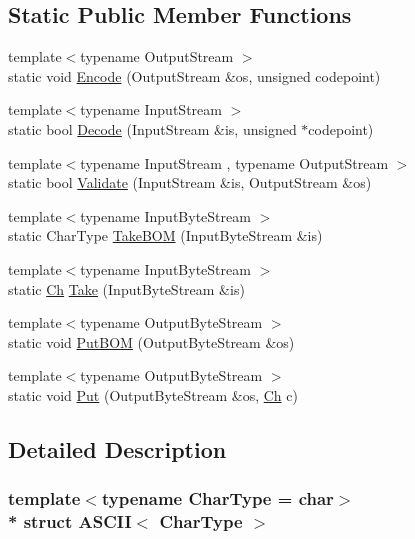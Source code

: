 \subsection*{Static Public Member Functions}
\begin{DoxyCompactItemize}
\item 
{\footnotesize template$<$typename Output\+Stream $>$ }\\static void \hyperlink{structASCII_af56b1605fe233c54693facc7de457f72}{Encode} (Output\+Stream \&os, unsigned codepoint)
\item 
{\footnotesize template$<$typename Input\+Stream $>$ }\\static bool \hyperlink{structASCII_a44844bbfd0a4fc282993fd72f3f58eee}{Decode} (Input\+Stream \&is, unsigned $\ast$codepoint)
\item 
{\footnotesize template$<$typename Input\+Stream , typename Output\+Stream $>$ }\\static bool \hyperlink{structASCII_a398680588a09e6ce9b56e32195047c78}{Validate} (Input\+Stream \&is, Output\+Stream \&os)
\item 
{\footnotesize template$<$typename Input\+Byte\+Stream $>$ }\\static Char\+Type \hyperlink{structASCII_aad78500eb98f45582a4df020e3fb2278}{Take\+B\+OM} (Input\+Byte\+Stream \&is)
\item 
{\footnotesize template$<$typename Input\+Byte\+Stream $>$ }\\static \hyperlink{structASCII_a1baf6e7914f165be952c30db664cefb4}{Ch} \hyperlink{structASCII_ab1b9fdf0a5c05658d62fded913d923a3}{Take} (Input\+Byte\+Stream \&is)
\item 
{\footnotesize template$<$typename Output\+Byte\+Stream $>$ }\\static void \hyperlink{structASCII_a3036dc1d604039c3224ca0a890ee0134}{Put\+B\+OM} (Output\+Byte\+Stream \&os)
\item 
{\footnotesize template$<$typename Output\+Byte\+Stream $>$ }\\static void \hyperlink{structASCII_a218b244b9cd961ea6c5775a734cec20e}{Put} (Output\+Byte\+Stream \&os, \hyperlink{structASCII_a1baf6e7914f165be952c30db664cefb4}{Ch} c)
\end{DoxyCompactItemize}


\subsection{Detailed Description}
\subsubsection*{template$<$typename Char\+Type = char$>$\\*
struct A\+S\+C\+I\+I$<$ Char\+Type $>$}

